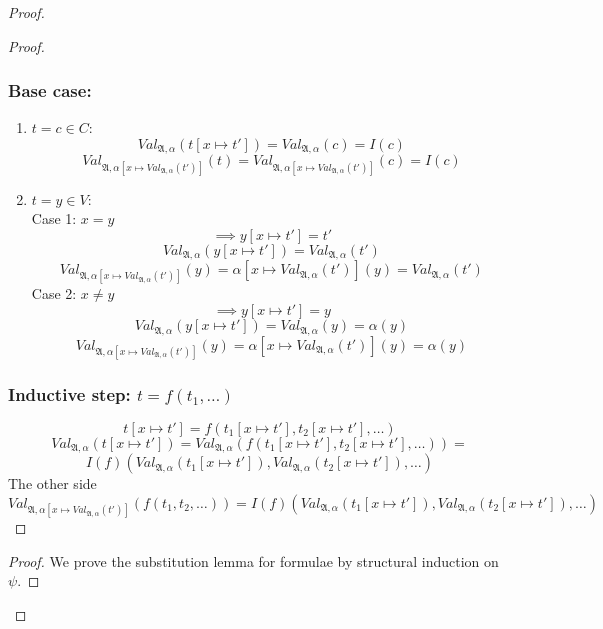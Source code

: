 \documentclass{article}
\begin{document}
\begin{proof}
\begin{proof}
    \subsubsection*{Base case: }
    \begin{enumerate}
        \item $t = c \in C$: 
        \[Val_{\mathfrak{A}, \alpha}(t[x \mapsto t']) = Val_{\mathfrak{A}, \alpha}(c) = I(c)\]
        \[Val_{\mathfrak{A}, \alpha[x \mapsto Val_{\mathfrak{A}, \alpha}(t')]}(t) = Val_{\mathfrak{A}, \alpha[x \mapsto Val_{\mathfrak{A}, \alpha}(t')]}(c) = I(c)\]
        \item $t = y \in V$:\\
        Case 1: $x = y$
        \[
        \implies y[x \mapsto t'] = t'
        \]
        \[
        Val_{\mathfrak{A}, \alpha}(y[x \mapsto t']) = Val_{\mathfrak{A}, \alpha}(t')
        \]
        \[
        Val_{\mathfrak{A}, \alpha[x \mapsto Val_{\mathfrak{A},\alpha}(t')]}(y)
        = \alpha[x \mapsto Val_{\mathfrak{A},\alpha}(t')](y)
        = Val_{\mathfrak{A},\alpha}(t')
        \]
        Case 2: $x \neq y$
        \[
        \implies y[x \mapsto t'] = y
        \]
        \[
        Val_{\mathfrak{A}, \alpha}(y[x \mapsto t']) = Val_{\mathfrak{A}, \alpha}(y) = \alpha(y)
        \]
        \[
        Val_{\mathfrak{A}, \alpha[x \mapsto Val_{\mathfrak{A},\alpha}(t')]}(y)
        = \alpha[x \mapsto Val_{\mathfrak{A},\alpha}(t')](y)
        = \alpha(y)
        \]
    \end{enumerate}
    \subsubsection*{Inductive step: $t = f(t_1, \dots)$}
    \[
        t[x \mapsto t'] = 
        f(t_1[x \mapsto t'], t_2[x \mapsto t'], \dots)
    \]
    \[
        Val_{\mathfrak{A}, \alpha}(t[x \mapsto t']) = 
        Val_{\mathfrak{A}, \alpha}(f(t_1[x \mapsto t'], t_2[x \mapsto t'], \dots)) =
    \]
    \[
        I(f)(Val_{\mathfrak{A}, \alpha}(t_1[x \mapsto t']), Val_{\mathfrak{A}, \alpha}(t_2[x \mapsto t']), \dots)
    \]
    The other side
    \[
        Val_{\mathfrak{A}, \alpha[x \mapsto Val_{\mathfrak{A},\alpha}(t')]}(f(t_1, t_2, \dots)) = 
        I(f)(Val_{\mathfrak{A}, \alpha}(t_1[x \mapsto t']), Val_{\mathfrak{A}, \alpha}(t_2[x \mapsto t']), \dots)
    \]
    \end{proof}
    \begin{proof}
        We prove the substitution lemma for formulae by structural induction on $\psi$.
        

\end{proof}
\end{proof}
\end{document}
